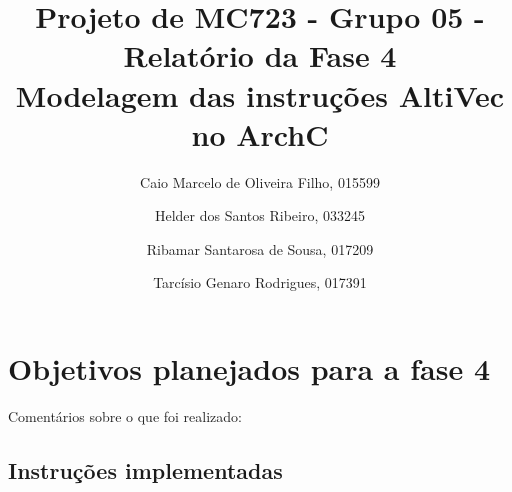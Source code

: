 \documentclass[twocolumn]{article}
\begin{document}
\title{Projeto de MC723 - Grupo 05 - Relatório da Fase 4\\ Modelagem das instruções AltiVec no ArchC}
\author{
Caio Marcelo de Oliveira Filho, 015599 \and
Helder dos Santos Ribeiro, 033245 \and
Ribamar Santarosa de Sousa, 017209 \and 
Tarcísio Genaro Rodrigues, 017391
}

\date{}
\maketitle

\section{Objetivos planejados para a fase 4}

\begin{itemize}



\end{itemize}

Comentários sobre o que foi realizado:

\subsection{Instruções implementadas}

\end{document}
